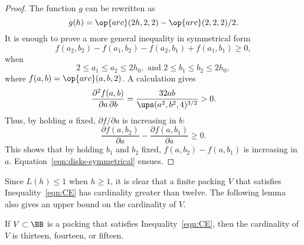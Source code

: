 \begin{proof}
The function $g$ can be rewritten as
\[
g(h) = \op{arc}(2h,2,2) - \op{arc}(2,2,2)/2.
\]
It is enough to prove a  more general inequality in
  symmetrical form
\begin{equation}\label{eqn:disks-symmetrical}
f(a_2,b_2) - f(a_1,b_2) - f(a_2,b_1) + f(a_1,b_1)\ge0, 
\end{equation}
when
\[
2\le a_1 \le a_2 \le 2h_0,\text{ and } 2\le b_1\le b_2 \le 2h_0,
\]
where $f(a,b) = \op{arc}(a,b,2)$.  
A calculation gives
\[
 \frac {\partial^2 f(a,b)}{\partial a\,\partial b} = \frac{32 a b}{\ups(a^2,b^2,4)^{3/2}} > 0.
\]
Thus, by holding $a$ fixed, $\partial f/\partial a$ is increasing in $b$:
\[
 \frac {\partial f(a,b_2) } {\partial a} -\frac{\partial f(a,b_1)}{\partial a} \ge 0.
\]
This shows that by holding $b_1$ and $b_2$ fixed, 
$f(a,b_2)-f(a,b_1)$ is increasing in $a$.
Equation~\ref{eqn:disks-symmetrical} ensues.
\end{proof}


Since $L(h)\le 1$ when $h\ge1$, it is clear that a finite packing $V$
that satisfies Inequality~\ref{eqn:CE} has cardinality greater than twelve.
The following lemma also gives an upper bound on the cardinality of $V$.

\begin{lemma}[]\label{lemma:13-14}  %
  If $V\subset \BB$ is a packing that satisfies
  Inequality~\ref{eqn:CE}, then the cardinality of $V$ is thirteen,
  fourteen, or fifteen.
\end{lemma}



